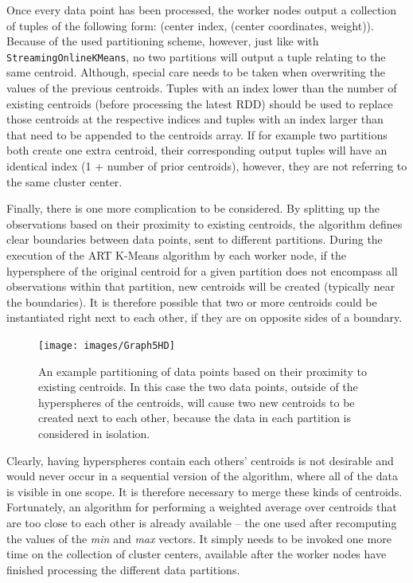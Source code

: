 \documentclass{l4proj}
\begin{document}
Once every data point has been processed, the worker nodes output a collection of tuples of the following form: (center index, (center coordinates, weight)). Because of the used partitioning scheme, however, just like with \texttt{StreamingOnlineKMeans}, no two partitions will output a tuple relating to the same centroid. Although, special care needs to be taken when overwriting the values of the previous centroids. Tuples with an index lower than the number of existing centroids (before processing the latest RDD) should be used to replace those centroids at the respective indices and tuples with an index larger than that need to be appended to the centroids array. If for example two partitions both create one extra centroid, their corresponding output tuples will have an identical index (1 + number of prior centroids), however, they are not referring to the same cluster center.

Finally, there is one more complication to be considered. By splitting up the observations based on their proximity to existing centroids, the algorithm defines clear boundaries between data points, sent to different partitions. During the execution of the ART K-Means algorithm by each worker node, if the hypersphere of the original centroid for a given partition does not encompass all observations within that partition, new centroids will be created (typically near the boundaries). It is therefore possible that two or more centroids could be instantiated right next to each other, if they are on opposite sides of a boundary.

\begin{figure}[H]
	\centering
    \texttt{[image: images/Graph5HD]}
    \caption{An example partitioning of data points based on their proximity to existing centroids. In this case the two data points, outside of the hyperspheres of the centroids, will cause two new centroids to be created next to each other, because the data in each partition is considered in isolation.} 
    \label{grapgh-boundary}
\end{figure}

Clearly, having hyperspheres contain each others' centroids is not desirable and would never occur in a sequential version of the algorithm, where all of the data is visible in one scope. It is therefore necessary to merge these kinds of centroids. Fortunately, an algorithm for performing a weighted average over centroids that are too  close to each other is already available -- the one used after recomputing the values of the \textit{min} and \textit{max} vectors. It simply needs to be invoked one more time on the collection of cluster centers, available after the worker nodes have finished processing the different data partitions. 
\end{document}
